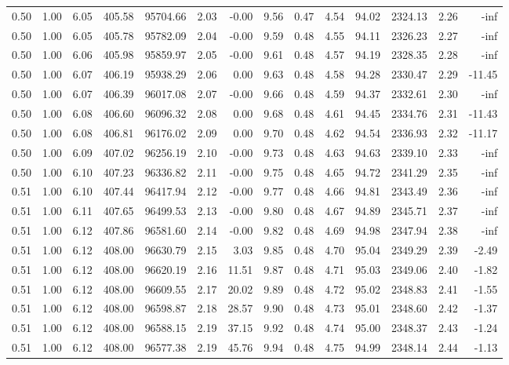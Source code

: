 \begin{table}[!ht]
\begin{tabular}{rrrrrrrrrrrrrr}
0.50 & 1.00 & 6.05 & 405.58 & 95704.66 & 2.03 & -0.00 & 9.56 & 0.47 & 4.54 & 94.02 & 2324.13 & 2.26 & -inf \\
0.50 & 1.00 & 6.05 & 405.78 & 95782.09 & 2.04 & -0.00 & 9.59 & 0.48 & 4.55 & 94.11 & 2326.23 & 2.27 & -inf \\
0.50 & 1.00 & 6.06 & 405.98 & 95859.97 & 2.05 & -0.00 & 9.61 & 0.48 & 4.57 & 94.19 & 2328.35 & 2.28 & -inf \\
0.50 & 1.00 & 6.07 & 406.19 & 95938.29 & 2.06 & 0.00 & 9.63 & 0.48 & 4.58 & 94.28 & 2330.47 & 2.29 & -11.45 \\
0.50 & 1.00 & 6.07 & 406.39 & 96017.08 & 2.07 & -0.00 & 9.66 & 0.48 & 4.59 & 94.37 & 2332.61 & 2.30 & -inf \\
0.50 & 1.00 & 6.08 & 406.60 & 96096.32 & 2.08 & 0.00 & 9.68 & 0.48 & 4.61 & 94.45 & 2334.76 & 2.31 & -11.43 \\
0.50 & 1.00 & 6.08 & 406.81 & 96176.02 & 2.09 & 0.00 & 9.70 & 0.48 & 4.62 & 94.54 & 2336.93 & 2.32 & -11.17 \\
0.50 & 1.00 & 6.09 & 407.02 & 96256.19 & 2.10 & -0.00 & 9.73 & 0.48 & 4.63 & 94.63 & 2339.10 & 2.33 & -inf \\
0.50 & 1.00 & 6.10 & 407.23 & 96336.82 & 2.11 & -0.00 & 9.75 & 0.48 & 4.65 & 94.72 & 2341.29 & 2.35 & -inf \\
0.51 & 1.00 & 6.10 & 407.44 & 96417.94 & 2.12 & -0.00 & 9.77 & 0.48 & 4.66 & 94.81 & 2343.49 & 2.36 & -inf \\
0.51 & 1.00 & 6.11 & 407.65 & 96499.53 & 2.13 & -0.00 & 9.80 & 0.48 & 4.67 & 94.89 & 2345.71 & 2.37 & -inf \\
0.51 & 1.00 & 6.12 & 407.86 & 96581.60 & 2.14 & -0.00 & 9.82 & 0.48 & 4.69 & 94.98 & 2347.94 & 2.38 & -inf \\
0.51 & 1.00 & 6.12 & 408.00 & 96630.79 & 2.15 & 3.03 & 9.85 & 0.48 & 4.70 & 95.04 & 2349.29 & 2.39 & -2.49 \\
0.51 & 1.00 & 6.12 & 408.00 & 96620.19 & 2.16 & 11.51 & 9.87 & 0.48 & 4.71 & 95.03 & 2349.06 & 2.40 & -1.82 \\
0.51 & 1.00 & 6.12 & 408.00 & 96609.55 & 2.17 & 20.02 & 9.89 & 0.48 & 4.72 & 95.02 & 2348.83 & 2.41 & -1.55 \\
0.51 & 1.00 & 6.12 & 408.00 & 96598.87 & 2.18 & 28.57 & 9.90 & 0.48 & 4.73 & 95.01 & 2348.60 & 2.42 & -1.37 \\
0.51 & 1.00 & 6.12 & 408.00 & 96588.15 & 2.19 & 37.15 & 9.92 & 0.48 & 4.74 & 95.00 & 2348.37 & 2.43 & -1.24 \\
0.51 & 1.00 & 6.12 & 408.00 & 96577.38 & 2.19 & 45.76 & 9.94 & 0.48 & 4.75 & 94.99 & 2348.14 & 2.44 & -1.13 \\

\end{tabular}
\end{table}
